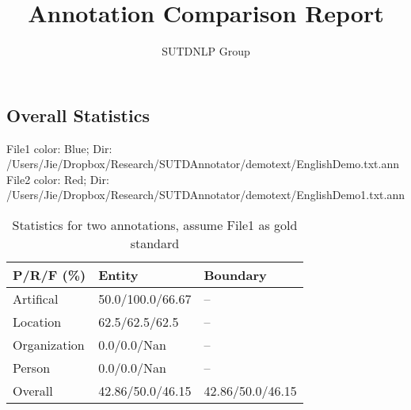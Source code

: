 \documentclass[runningheads,a4paper]{llncs}
\begin{document}
\begin{CJK*}{UTF8}{gbsn}
\mainmatter  %
\title{Annotation Comparison Report}
\author{SUTDNLP Group}
\maketitle

\section{Overall Statistics}
File1 color: \colorbox{blue!30}{Blue}; Dir: \colorbox{blue!30}{/Users/Jie/Dropbox/Research/SUTDAnnotator/demotext/EnglishDemo.txt.ann}\\
File2 color: \colorbox{red!30}{Red}; Dir: \colorbox{red!30}{/Users/Jie/Dropbox/Research/SUTDAnnotator/demotext/EnglishDemo1.txt.ann}\\
\begin{table}[!htbp]
\centering
\caption{Statistics for two annotations, assume File1 as gold standard}
\begin{tabular}{l|l|l}
\hline
P/R/F (\%)& Entity &Boundary\\
\hline
Artifical& 50.0/100.0/66.67 &--\\
Location& 62.5/62.5/62.5 &--\\
Organization& 0.0/0.0/Nan &--\\
Person& 0.0/0.0/Nan &--\\
\hline
Overall& 42.86/50.0/46.15 &42.86/50.0/46.15\\
\hline
\end{tabular}
\end{table}

\end{CJK*}
\end{document}
